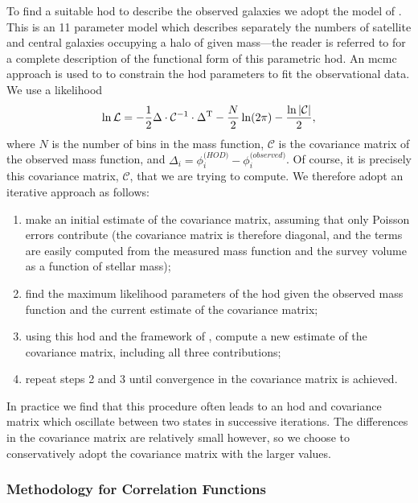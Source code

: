 To find a suitable \gls{hod} to describe the observed galaxies we adopt the model of \cite{behroozi_comprehensive_2010}. This is an 11 parameter model which describes separately the numbers of satellite and central galaxies occupying a halo of given mass---the reader is referred to \cite{behroozi_comprehensive_2010} for a complete description of the functional form of this parametric \gls{hod}. An \gls{mcmc} approach is used to to constrain the \gls{hod} parameters to fit the observational data. We use a likelihood
\begin{equation}
 \ln \mathcal{L} = -{1\over 2} \Delta\cdot \mathcal{C}^{-1}\cdot \Delta^{\mathrm T} - {N \over 2} \ln(2\pi) - {\ln |\mathcal{C}| \over 2},
\end{equation}
where $N$ is the number of bins in the mass function, $\mathcal{C}$ is the covariance matrix of the observed mass function, and $\Delta_i = \phi_i^{\mathrm (HOD)} - \phi_i^{\mathrm (observed)}$. Of course, it is precisely this covariance matrix, $\mathcal{C}$, that we are trying to compute. We therefore adopt an iterative approach as follows:
\begin{enumerate}
 \item make an initial estimate of the covariance matrix, assuming that only Poisson errors contribute (the covariance matrix is therefore diagonal, and the terms are easily computed from the measured mass function and the survey volume as a function of stellar mass);
 \item find the maximum likelihood parameters of the \gls{hod} given the observed mass function and the current estimate of the covariance matrix;
 \item using this \gls{hod} and the framework of \cite{smith_how_2012}, compute a new estimate of the covariance matrix, including all three contributions;
 \item repeat steps 2 and 3 until convergence in the covariance matrix is achieved.
\end{enumerate}
In practice we find that this procedure often leads to an \gls{hod} and covariance matrix which oscillate between two states in successive iterations. The differences in the covariance matrix are relatively small however, so we choose to conservatively adopt the covariance matrix with the larger values.

\subsubsection{Methodology for Correlation Functions}

